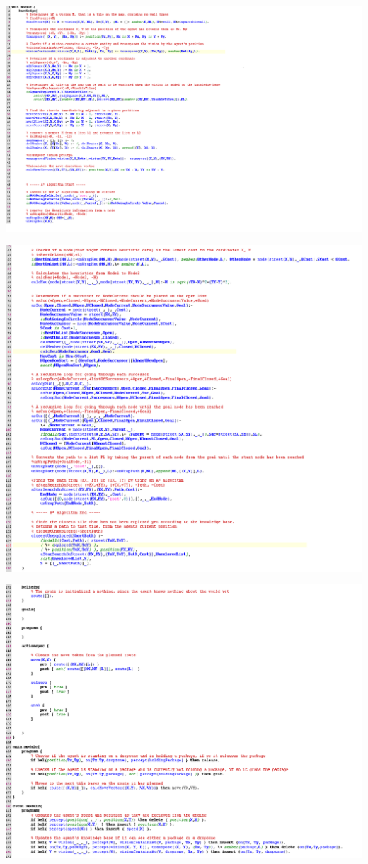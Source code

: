 \noindent

\includegraphics[width=1.15\textwidth]{goalSourceCodePart1}

\includegraphics[width=1.15\textwidth]{goalSourceCodePart2}

\includegraphics[width=1.15\textwidth]{goalSourceCodePart3}
